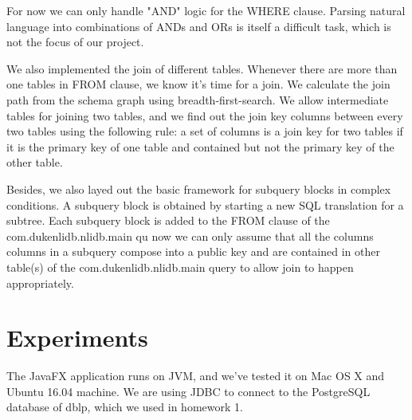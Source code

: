 \documentclass[twocolumn]{article}
\begin{document}
For now we can only handle "AND" logic for the WHERE clause. Parsing natural language into combinations of ANDs and ORs is itself a difficult task, which is not the focus of our project.

We also implemented the join of different tables. Whenever there are more than one tables in FROM clause, we know it's time for a join. We calculate the join path from the schema graph using breadth-first-search. We allow intermediate tables for joining two tables, and we find out the join key columns between every two tables using the following rule: a set of columns is a join key for two tables if it is the primary key of one table and contained but not the primary key of the other table.

Besides, we also layed out the basic framework for subquery blocks in complex conditions. A subquery block is obtained by starting a new SQL translation for a subtree. Each subquery block is added to the FROM clause of the com.dukenlidb.nlidb.main qu now we can only assume that all the columns columns in a subquery compose into a public key and are contained in other table(s) of the com.dukenlidb.nlidb.main query to allow join to happen appropriately.

\section{Experiments}
The JavaFX application runs on JVM, and we’ve tested it on Mac OS X and Ubuntu 16.04 machine. We are using JDBC to connect to the PostgreSQL database of dblp, which we used in homework 1.
\end{document}
